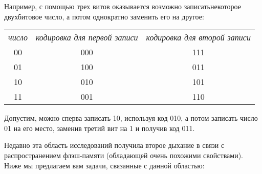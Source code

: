 Например, с помощью трех витов оказывается возможно записать\linebreak некоторое двухбитовое
число, а потом однократно заменить его на другое:
\begin{center}
\begin{tabular}{ccc}
{\itshape число}    & {\itshape кодировка для первой записи  }   & {\itshape кодировка для второй записи}\\
00       & 000                             & 111\\
01       & 100                             & 011\\
10       & 010                             & 101\\
11       & 001                             & 110
\end{tabular}
\end{center}
Допустим, можно сперва записать 10, используя код 010, а потом записать число 01
на его место, заменив третий вит на 1 и получив код 011.

Недавно эта область исследований получила второе дыхание в связи с распространением
флэш-памяти (обладающей очень похожими свойствами). 
Ниже мы предлагаем вам задачи, связанные с данной областью:

